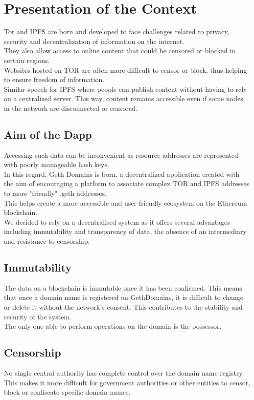 \documentclass[main.tex]{subfiles}
\begin{document}
\section{Presentation of the Context}\label{sec:presentation-of-the-context}

Tor and IPFS are born and developed to face challenges related to privacy, security and decentralization of information on the internet.\\
They also allow access to online content that could be censored or blocked in certain regions.\\
Websites hosted on TOR are often more difficult to censor or block, thus helping to ensure freedom of information.\\
Similar speech for IPFS where people can publish content without having to rely on a centralized server. This way, content remains accessible even if some nodes in the network are disconnected or censored.


\subsection{Aim of the Dapp}
Accessing such data can be inconvenient as resource addresses are represented with poorly manageable hash keys.\\
In this regard, Geth Domains is born, a decentralized application created with the aim of encouraging a platform to associate complex TOR and IPFS addresses to more "friendly" .geth addresses.\\
This helps create a more accessible and user-friendly ecosystem on the Ethereum blockchain.\\
\newline
We decided to rely on a decentralised system as it offers several advantages including immutability and transparency of data, the absence of an intermediary and resistance to censorship.

\subsection{Immutability}
The data on a blockchain is immutable once it has been confirmed. This means that once a domain name is registered on GethDomains, it is difficult to change or delete it without the network’s consent. This contributes to the stability and security of the system.\\
The only one able to perform operations on the domain is the possessor.

\subsection{Censorship}
No single central authority has complete control over the domain name registry.\\
This makes it more difficult for government authorities or other entities to censor, block or confiscate specific domain names.
\end{document}
